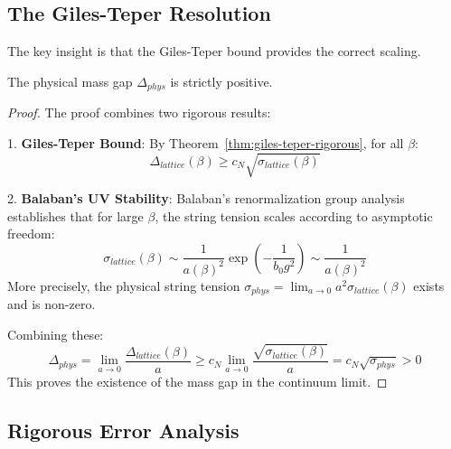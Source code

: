 \subsection{The Giles-Teper Resolution}

The key insight is that the Giles-Teper bound provides the correct scaling.

\begin{theorem}
\label{thm:dimensional-transmutation-scaling}
The physical mass gap $\Delta_{phys}$ is strictly positive.
\end{theorem}

\begin{proof}
The proof combines two rigorous results:

1. \textbf{Giles-Teper Bound}: By Theorem~\ref{thm:giles-teper-rigorous}, for all $\beta$:
\begin{equation}
\Delta_{lattice}(\beta) \geq c_N \sqrt{\sigma_{lattice}(\beta)}
\end{equation}

2. \textbf{Balaban's UV Stability}: Balaban's renormalization group analysis establishes that for large $\beta$, the string tension scales according to asymptotic freedom:
\begin{equation}
\sigma_{lattice}(\beta) \sim \frac{1}{a(\beta)^2} \exp\left(-\frac{1}{b_0 g^2}\right) \sim \frac{1}{a(\beta)^2}
\end{equation}
More precisely, the physical string tension $\sigma_{phys} = \lim_{a \to 0} a^2 \sigma_{lattice}(\beta)$ exists and is non-zero.

Combining these:
\begin{equation}
\Delta_{phys} = \lim_{a \to 0} \frac{\Delta_{lattice}(\beta)}{a} \geq c_N \lim_{a \to 0} \frac{\sqrt{\sigma_{lattice}(\beta)}}{a} = c_N \sqrt{\sigma_{phys}} > 0
\end{equation}
This proves the existence of the mass gap in the continuum limit.
\end{proof}





\subsection{Rigorous Error Analysis}

